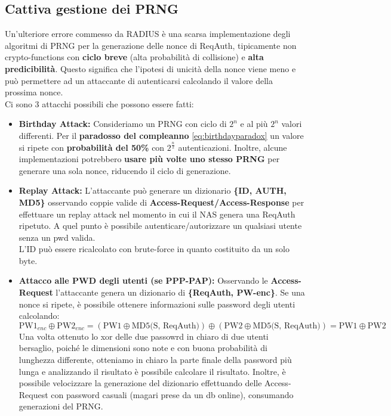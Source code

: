 \subsection{Cattiva gestione dei PRNG}
Un'ulteriore errore commesso da RADIUS è una scarsa implementazione degli algoritmi di PRNG per la generazione delle nonce di ReqAuth, tipicamente non crypto-functions con \textbf{ciclo breve} (alta probabilità di collisione) e \textbf{alta predicibilità}. Questo significa che l'ipotesi di unicità della nonce viene meno e può permettere ad un attaccante di autenticarsi calcolando il valore della prossima nonce.\\
Ci sono 3 attacchi possibili che possono essere fatti:
\begin{itemize}
    \item \textbf{Birthday Attack:} Consideriamo un PRNG con ciclo di $2^n$ e al più $2^n$ valori differenti. Per il \textbf{paradosso del compleanno} \cref{eq:birthdayparadox} un valore si ripete con \textbf{probabilità del 50\%} con $2^\frac{n}{2}$ autenticazioni. Inoltre, alcune implementazioni potrebbero \textbf{usare più volte uno stesso PRNG} per generare una sola nonce, riducendo il ciclo di generazione.
    \item \textbf{Replay Attack:} L'attaccante può generare un dizionario \textbf{\{ID, AUTH, MD5\}} osservando coppie valide di \textbf{Access-Request/Access-Response} per effettuare un replay attack nel momento in cui il NAS genera una ReqAuth ripetuto. A quel punto è possibile autenticare/autorizzare un qualsiasi utente senza un pwd valida.\\
    L'ID può essere ricalcolato con brute-force in quanto costituito da un solo byte.
    \item \textbf{Attacco alle PWD degli utenti (se PPP-PAP):} Osservando le \textbf{Access-Request} l'attaccante genera un dizionario di \textbf{\{ReqAuth, PW-enc\}}. Se una nonce si ripete, è possibile ottenere informazioni sulle password degli utenti calcolando:
    \[\text{PW1}_{enc}\oplus\text{PW2}_{enc}=(\text{PW1}\oplus\text{MD5(S, ReqAuth)})\oplus(\text{PW2}\oplus\text{MD5(S, ReqAuth)})=\text{PW1}\oplus\text{PW2}\]
    Una volta ottenuto lo xor delle due passowrd in chiaro di due utenti bersaglio, poiché le dimensioni sono note e con buona probabilità di lunghezza differente, otteniamo in chiaro la parte finale della password più lunga e analizzando il risultato è possibile calcolare il risultato. Inoltre, è possibile velocizzare la generazione del dizionario effettuando delle Access-Request con password casuali (magari prese da un db online), consumando generazioni del PRNG.
\end{itemize}

